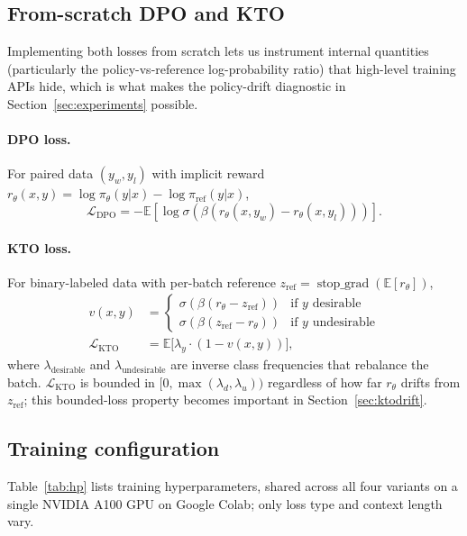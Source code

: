 \subsection{From-scratch DPO and KTO}
Implementing both losses from scratch lets us instrument internal quantities (particularly the policy-vs-reference log-probability ratio) that high-level training APIs hide, which is what makes the policy-drift diagnostic in Section~\ref{sec:experiments} possible.

\paragraph{DPO loss.} For paired data $(y_w, y_l)$ with implicit reward $r_\theta(x,y) = \log \pi_\theta(y|x) - \log \pi_\text{ref}(y|x)$,
\begin{equation}
\mathcal{L}_\text{DPO} = -\mathbb{E}\left[\log \sigma\!\left(\beta (r_\theta(x,y_w) - r_\theta(x,y_l))\right)\right].
\end{equation}

\paragraph{KTO loss.} For binary-labeled data with per-batch reference $z_\text{ref} = \operatorname{stop\_grad}(\mathbb{E}[r_\theta])$,
\begin{align}
v(x,y) &= \begin{cases} \sigma(\beta(r_\theta - z_\text{ref})) & \text{if } y \text{ desirable} \\ \sigma(\beta(z_\text{ref} - r_\theta)) & \text{if } y \text{ undesirable}\end{cases} \\[2pt]
\mathcal{L}_\text{KTO} &= \mathbb{E}\big[\lambda_y \cdot (1 - v(x,y))\big],
\end{align}
where $\lambda_\text{desirable}$ and $\lambda_\text{undesirable}$ are inverse class frequencies that rebalance the batch.  $\mathcal{L}_\text{KTO}$ is bounded in $[0, \max(\lambda_d, \lambda_u))$ regardless of how far $r_\theta$ drifts from $z_\text{ref}$; this bounded-loss property becomes important in Section~\ref{sec:ktodrift}.

\subsection{Training configuration}
Table~\ref{tab:hp} lists training hyperparameters, shared across all four variants on a single NVIDIA A100 GPU on Google Colab; only loss type and context length vary.

